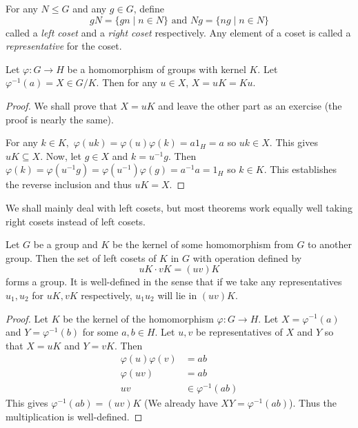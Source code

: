 \begin{definition}
    For any $N\leq G$ and any $g\in G$, define
    $$gN=\{gn\mid n\in N\}\text{ and }Ng=\{ng\mid n\in N\}$$
    called a \textit{left coset} and a \textit{right coset} respectively. Any element of a coset is called a \textit{representative} for the coset.
\end{definition}

\begin{theorem}
\label{fiberIsIndepOfRep}
    Let $\varphi:G\to H$ be a homomorphism of groups with kernel $K$. Let $\varphi^{-1}(a)=X\in G/K$. Then for any $u\in X$, $X=uK=Ku$.
\end{theorem}
\begin{proof}
    We shall prove that $X=uK$ and leave the other part as an exercise (the proof is nearly the same).
    
    For any $k\in K,$ $\varphi(uk)=\varphi(u)\varphi(k)=a1_H=a$ so $uk\in X$. This gives $uK\subseteq X$. Now, let $g\in X$ and $k=u^{-1}g$. Then $\varphi(k)=\varphi(u^{-1}g)=\varphi(u^{-1})\varphi(g)=a^{-1}a=1_H$ so $k\in K$. This establishes the reverse inclusion and thus $uK=X$.
\end{proof}

We shall mainly deal with left cosets, but most theorems work equally well taking right cosets instead of left cosets.

\begin{theorem}
\label{describeCosetMultiplication}
    Let $G$ be a group and $K$ be the kernel of some homomorphism from $G$ to another group. Then the set of left cosets of $K$ in $G$ with operation defined by $$uK\cdot vK=(uv)K$$ forms a group. It is well-defined in the sense that if we take any representatives $u_1,u_2$ for $uK,vK$ respectively, $u_1u_2$ will lie in $(uv)K$.
\end{theorem}
\begin{proof}
    Let $K$ be the kernel of the homomorphism $\varphi:G\to H$. Let $X=\varphi^{-1}(a)$ and $Y=\varphi^{-1}(b)$ for some $a,b\in H$. Let $u,v$ be representatives of $X$ and $Y$ so that $X=uK$ and $Y=vK$. Then
    \begin{align*}
        \varphi(u)\varphi(v) &= ab \\
        \varphi(uv) &= ab \\
        uv &\in \varphi^{-1}(ab)
    \end{align*}
    This gives $\varphi^{-1}(ab)=(uv)K$ (We already have $XY=\varphi^{-1}(ab)$). Thus the multiplication is well-defined.
\end{proof}

